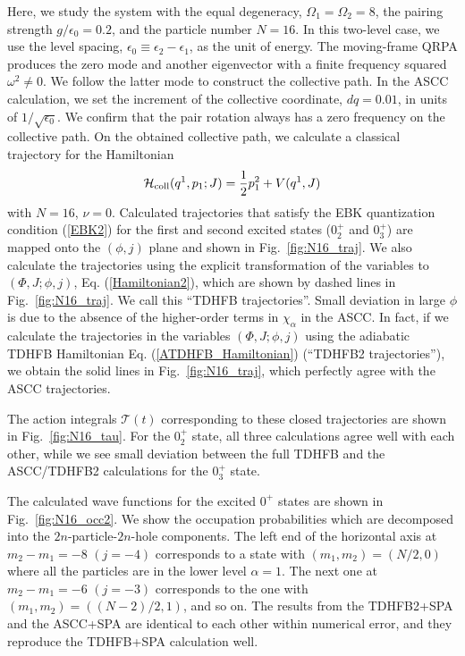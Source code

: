 \documentclass[11pt]{book} %
\begin{document}
Here, we study the system with the equal degeneracy,
$\Omega_1=\Omega_2=8$, 
the pairing strength $g/\epsilon_0=0.2$,
and the particle number $N=16$. 
In this two-level case, we use the level spacing,
$\epsilon_0\equiv \epsilon_2-\epsilon_1$,
as the unit of energy.
The moving-frame QRPA produces the zero mode and another eigenvector
with a finite frequency squared $\omega^2\neq 0$.
We follow the latter mode to construct the collective path.
In the ASCC calculation, we set the increment of the
collective coordinate, $dq=0.01$,
in units of $1/\sqrt{\epsilon_0}$.
We confirm that the pair rotation always has a zero frequency
on the collective path.
On the obtained collective path, we calculate a classical trajectory
for the Hamiltonian
\begin{equation}
\mathcal{H}_{\rm coll}(q^1,p_1;J)=\frac{1}{2} p_1^2 + V(q^1,J)
\end{equation}
with $N=16$, $\nu=0$.
Calculated trajectories that satisfy the EBK quantization condition
(\ref{EBK2}) for the first and second excited states ($0_2^+$ and $0_3^+$)
are mapped onto the $(\phi,j)$ plane and
shown in Fig.~\ref{fig:N16_traj}.
We also calculate the trajectories using the explicit transformation
of the variables to $(\Phi,J;\phi,j)$, Eq. (\ref{Hamiltonian2}), which
are shown by dashed lines in Fig.~\ref{fig:N16_traj}.
We call this ``TDHFB trajectories''.
Small deviation in large $\phi$ is due to the absence of the higher-order
terms in $\chi_\alpha$ in the ASCC.
In fact, if we calculate the trajectories in the variables
$(\Phi,J;\phi,j)$ using the adiabatic TDHFB Hamiltonian Eq. (\ref{ATDHFB_Hamiltonian}) (``TDHFB2 trajectories''),
we obtain the solid lines in Fig.~\ref{fig:N16_traj},
which perfectly agree with the ASCC trajectories.

The action integrals $\mathcal{T}(t)$ corresponding to
these closed trajectories are shown in Fig.~\ref{fig:N16_tau}.
For the $0_2^+$ state,
all three calculations agree well
with each other, while we see small deviation between the full TDHFB
and the ASCC/TDHFB2 calculations for the $0_3^+$ state.

The calculated wave functions for the excited $0^+$ states 
are shown in Fig.~\ref{fig:N16_occ2}. 
We show the occupation probabilities which are decomposed 
into the $2n$-particle-$2n$-hole components. 
The left end of the horizontal axis at $m_2-m_1=-8$ $(j=-4)$
corresponds to a state with $(m_1,m_2)=(N/2,0)$ where all the particles
are in the lower level $\alpha=1$.
The next one at $m_2-m_1=-6$ $(j=-3)$ corresponds to the one with
$(m_1,m_2)=((N-2)/2,1)$, and so on.
The results from the TDHFB2+SPA and the ASCC+SPA are identical to each other
within numerical error, and they reproduce
the TDHFB+SPA calculation well.
\end{document}
